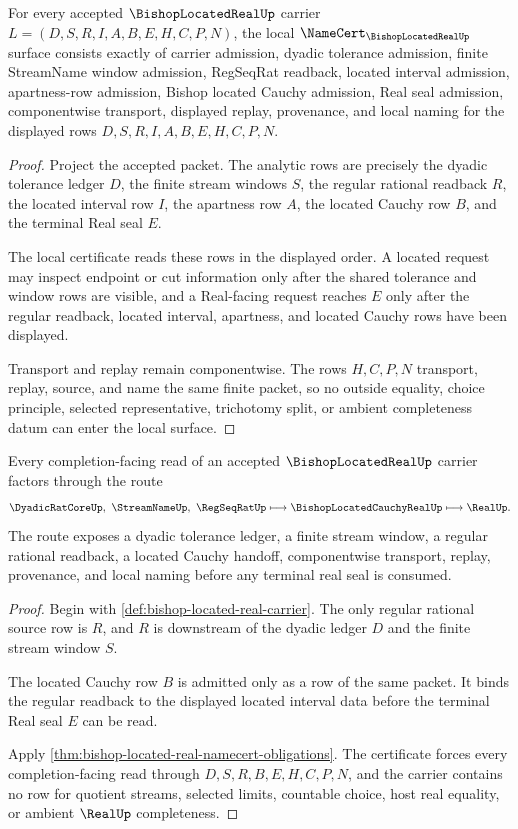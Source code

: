 \begin{theorem}
\label{thm:bishop-located-real-namecert-obligations}
For every accepted $\BishopLocatedRealUp$ carrier $L=(D,S,R,I,A,B,E,H,C,P,N)$, the local $\NameCert_{\BishopLocatedRealUp}$ surface consists exactly of carrier admission, dyadic tolerance admission, finite StreamName window admission, RegSeqRat readback, located interval admission, apartness-row admission, Bishop located Cauchy admission, Real seal admission, componentwise transport, displayed replay, provenance, and local naming for the displayed rows $D,S,R,I,A,B,E,H,C,P,N$.
\end{theorem}
\begin{proof}
Project the accepted packet. The analytic rows are precisely the dyadic tolerance ledger $D$, the finite stream windows $S$, the regular rational readback $R$, the located interval row $I$, the apartness row $A$, the located Cauchy row $B$, and the terminal Real seal $E$.

The local certificate reads these rows in the displayed order. A located request may inspect endpoint or cut information only after the shared tolerance and window rows are visible, and a Real-facing request reaches $E$ only after the regular readback, located interval, apartness, and located Cauchy rows have been displayed.

Transport and replay remain componentwise. The rows $H,C,P,N$ transport, replay, source, and name the same finite packet, so no outside equality, choice principle, selected representative, trichotomy split, or ambient completeness datum can enter the local surface.
\end{proof}

\begin{theorem}
\label{thm:bishop-located-real-regseqrat-route}
Every completion-facing read of an accepted $\BishopLocatedRealUp$ carrier factors through the route
$$
\DyadicRatCoreUp,\ \StreamNameUp,\ \RegSeqRatUp
\longmapsto
\BishopLocatedCauchyRealUp
\longmapsto
\RealUp .
$$
The route exposes a dyadic tolerance ledger, a finite stream window, a regular rational readback, a located Cauchy handoff, componentwise transport, replay, provenance, and local naming before any terminal real seal is consumed.
\end{theorem}
\begin{proof}
Begin with \autoref{def:bishop-located-real-carrier}. The only regular rational source row is $R$, and $R$ is downstream of the dyadic ledger $D$ and the finite stream window $S$.

The located Cauchy row $B$ is admitted only as a row of the same packet. It binds the regular readback to the displayed located interval data before the terminal Real seal $E$ can be read.

Apply \autoref{thm:bishop-located-real-namecert-obligations}. The certificate forces every completion-facing read through $D,S,R,B,E,H,C,P,N$, and the carrier contains no row for quotient streams, selected limits, countable choice, host real equality, or ambient $\RealUp$ completeness.
\end{proof}

